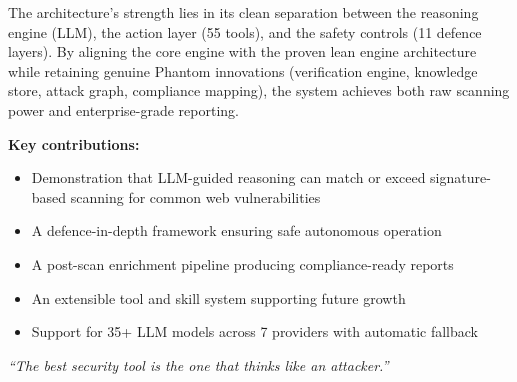 \documentclass[11pt,a4paper]{article}
\begin{document}
The architecture's strength lies in its clean separation between the reasoning
engine (LLM), the action layer (55 tools), and the safety controls (11 defence
layers). By aligning the core engine with the proven lean engine architecture while
retaining genuine Phantom innovations (verification engine, knowledge store,
attack graph, compliance mapping), the system achieves both raw scanning power
and enterprise-grade reporting.

\medskip
\noindent\textbf{Key contributions:}
\begin{itemize}[noitemsep]
  \item Demonstration that LLM-guided reasoning can match or exceed
        signature-based scanning for common web vulnerabilities
  \item A defence-in-depth framework ensuring safe autonomous operation
  \item A post-scan enrichment pipeline producing compliance-ready reports
  \item An extensible tool and skill system supporting future growth
  \item Support for 35+ LLM models across 7 providers with automatic fallback
\end{itemize}

\vspace{1cm}
\begin{center}
\textit{``The best security tool is the one that thinks like an attacker.''}
\end{center}


\newpage
\appendix
\end{document}
